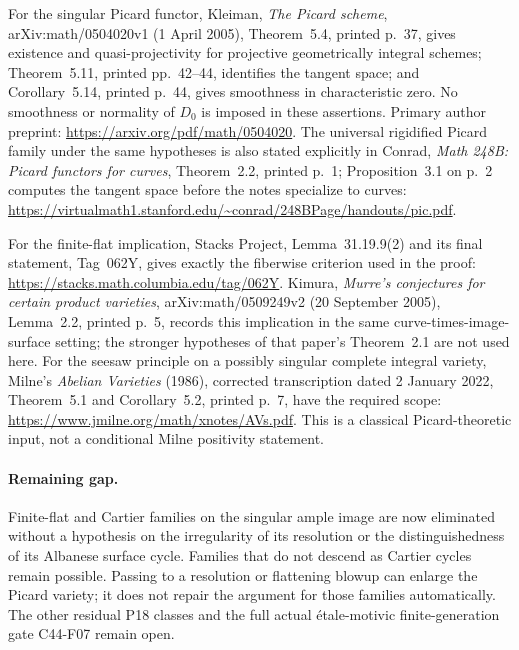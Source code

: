 \documentclass[11pt]{article}
\theoremstyle{remark}\newtheorem{remark}[theorem]{Remark}
\begin{document}
For the singular Picard functor, Kleiman,
\emph{The Picard scheme}, arXiv:math/0504020v1
(1 April 2005), Theorem~5.4, printed p.~37,
gives existence and quasi-projectivity for
projective geometrically integral schemes;
Theorem~5.11, printed pp.~42--44, identifies
the tangent space; and Corollary~5.14,
printed p.~44, gives smoothness in
characteristic zero.  No smoothness or
normality of $D_0$ is imposed in these
assertions.  Primary author preprint:
\url{https://arxiv.org/pdf/math/0504020}.
The universal rigidified Picard family under
the same hypotheses is also stated explicitly
in Conrad, \emph{Math 248B: Picard functors
for curves}, Theorem~2.2, printed p.~1;
Proposition~3.1 on p.~2 computes the tangent
space before the notes specialize to curves:
\url{https://virtualmath1.stanford.edu/~conrad/248BPage/handouts/pic.pdf}.

For the finite-flat implication, Stacks
Project, Lemma~31.19.9(2) and its final
statement, Tag~062Y, gives exactly the
fiberwise criterion used in the proof:
\url{https://stacks.math.columbia.edu/tag/062Y}.
Kimura, \emph{Murre's conjectures for certain
product varieties}, arXiv:math/0509249v2
(20 September 2005), Lemma~2.2, printed p.~5,
records this implication in the same
curve-times-image-surface setting; the
stronger hypotheses of that paper's
Theorem~2.1 are not used here.
For the seesaw principle on a possibly
singular complete integral variety, Milne's
\emph{Abelian Varieties} (1986), corrected
transcription dated 2 January 2022,
Theorem~5.1 and Corollary~5.2, printed p.~7,
have the required scope:
\url{https://www.jmilne.org/math/xnotes/AVs.pdf}.
This is a classical Picard-theoretic input,
not a conditional Milne positivity statement.

\paragraph{Remaining gap.}
Finite-flat and Cartier families on the
singular ample image are now eliminated
without a hypothesis on the irregularity
of its resolution or the distinguishedness
of its Albanese surface cycle.  Families
that do not descend as Cartier cycles
remain possible.  Passing to a resolution
or flattening blowup can enlarge the Picard
variety; it does not repair the argument
for those families automatically.
The other residual P18 classes and the
full actual \'etale-motivic finite-generation
gate C44-F07 remain open.

\end{document}
